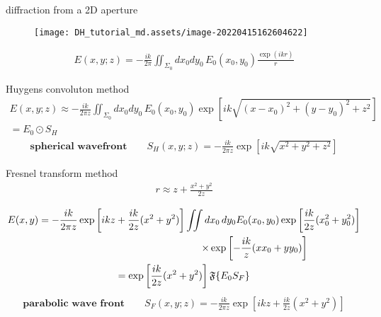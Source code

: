 \documentclass[t, aspectratio=169]{beamer}
\begin{document}
\begin{frame}{diffraction from a 2D aperture}
	\begin{figure}
		\texttt{[image: DH\_tutorial\_md.assets/image-20220415162604622]}
	\end{figure}
	\begin{gather*}
E(x,y;z) = -\frac{ik}{2\pi}\iint_{\Sigma_0} dx_0dy_0\,E_0(x_0,y_0)\frac{\exp(ikr)}{r}
	\end{gather*}
\end{frame}


\begin{frame}{Huygens convoluton method}	
	\begin{gather*}	
E(x,y;z) \approx -\frac{ik}{2\pi z} \iint_{\Sigma_0} dx_0dy_0\,E_0(x_0,y_0)\exp\left[ik\sqrt{(x-x_0)^2 + (y-y_0)^2 + z^2 }\right] \\
= E_0 \odot S_H 
	\end{gather*}
	\pause
	\begin{gather*}
\textbf{spherical wavefront} \qquad S_H(x,y;z) = - \frac{ik}{2\pi z} \exp\left[ik\sqrt{x^2+y^2+z^2}\right]
	\end{gather*}
\end{frame}


\begin{frame}{Fresnel transform method}	
	\vspace{-5 mm}
	\begin{gather*}	
r \approx z + \frac{x^2+y^2}{2z} \\
	\end{gather*}
	\pause
	\vspace{-8 mm}
	\begin{gather*}
E(x,y) = - \frac{ik}{2\pi z} \exp\left[ikz + \frac{ik}{2z} (x^2+y^2)\right] \iint dx_0\,dy_0E_0(x_0,y_0)\exp\left[\frac{ik}{2z}(x_0^2+y_0^2)\right] \\
\hspace{50mm}\times\exp\left[-\frac{ik}{z}(xx_0+yy_0)\right] \\ 
=\exp\left[\frac{ik}{2z}(x^2+y^2)\right]\mathfrak F\{E_0S_F\} \\
	\end{gather*}
	\pause
	\vspace{-8 mm}
	\begin{gather*}
\textbf{parabolic wave front} \qquad S_F(x,y;z) = -\frac{ik}{2\pi z}\exp\left[ikz + \frac{ik}{2z}(x^2+y^2)\right]
	\end{gather*}
\end{frame}
\end{document}
